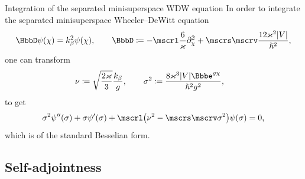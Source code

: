 \documentclass[8pt]{beamer}
\begin{document}
\begin{frame}%
{Integration of the separated minisuperspace WDW equation}%
In order to integrate the separated minisuperspace Wheeler--DeWitt equation
\begin{align}
\BbbD \rfun{\psi}{\chi} = k_\beta^2 \rfun{\psi}{\chi},\qquad
\BbbD \coloneqq
-\mscrl \frac{6}{\varkappa} \partial_\chi^2
+ \mscrs\mscrv \frac{12\varkappa^2\vbr{V}}{\hslash^2},
\end{align}
one can transform
\begin{align}
\nu &\coloneqq \sqrt{\frac{2\varkappa}{3}}\frac{k_\beta}{g},\qquad
\sigma^2 \coloneqq 
\frac{8\varkappa^3\vbr{V}\ee^{g\chi}}{\hslash^2 g^2},
\end{align}
to get
\begin{align}
\sigma^2\rfun{\psi''}{\sigma}
+\sigma\rfun{\psi'}{\sigma}
+\mscrl\rbr{\nu^2-\mscrs\mscrv\sigma^2}\rfun{\psi}{\sigma} = 0,
\end{align}
which is of the standard Besselian form.
\end{frame}

\subsection*{Self-adjointness}
\end{document}
